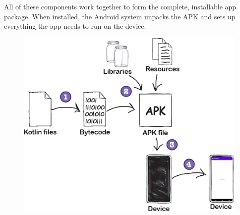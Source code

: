 All of these components work together to form the complete, installable app package. When installed, the Android system unpacks the APK and sets up everything the app needs to run on the device.
\begin{figure}
	\centering
	\includegraphics[width=0.7\linewidth]{apk_to_app}
	\caption{}
	\label{fig:apktoapp}
\end{figure}
